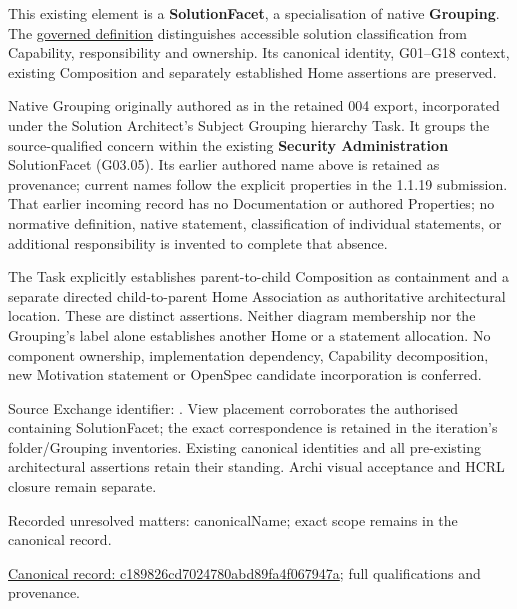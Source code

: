 This existing element is a \textbf{SolutionFacet}, a specialisation of native
\textbf{Grouping}. The \href{\detokenize{../../../../../../../governance/continuum-representation.md#solutionfacet-classification--1119-candidate}}{governed definition}
distinguishes accessible solution classification from Capability, responsibility
and ownership. Its canonical identity, G01–G18 context, existing Composition
and separately established Home assertions are preserved.



Native Grouping originally authored as \texttt{} in the retained 004 export,
incorporated under the Solution Architect's Subject Grouping hierarchy Task.
It groups the source-qualified \texttt{} concern within
the existing \textbf{Security Administration} SolutionFacet (G03.05). Its earlier authored name above is retained as provenance; current names
follow the explicit properties in the 1.1.19 submission.
That earlier incoming record has no Documentation or authored Properties; no normative
definition, native statement, classification of individual statements, or
additional responsibility is invented to complete that absence.



The Task explicitly establishes parent-to-child Composition as containment and
a separate directed child-to-parent Home Association as authoritative architectural
location. These are distinct assertions. Neither diagram membership nor the
Grouping's label alone establishes another Home or a statement allocation.
No component ownership, implementation dependency, Capability decomposition,
new Motivation statement or OpenSpec candidate incorporation is conferred.



Source Exchange identifier: \texttt{}. View placement corroborates
the authorised containing SolutionFacet; the exact correspondence is retained in the
iteration's folder/Grouping inventories. Existing canonical identities and all
pre-existing architectural assertions retain their standing. Archi visual
acceptance and HCRL closure remain separate.


{\small Recorded unresolved matters: canonicalName; exact scope remains in the canonical record.}\par
{\footnotesize \href{../../../../../../../continuum/grouping/c189826cd7024780abd89fa4f067947a.md}{Canonical record: c189826cd7024780abd89fa4f067947a}; full qualifications and provenance.}\par
